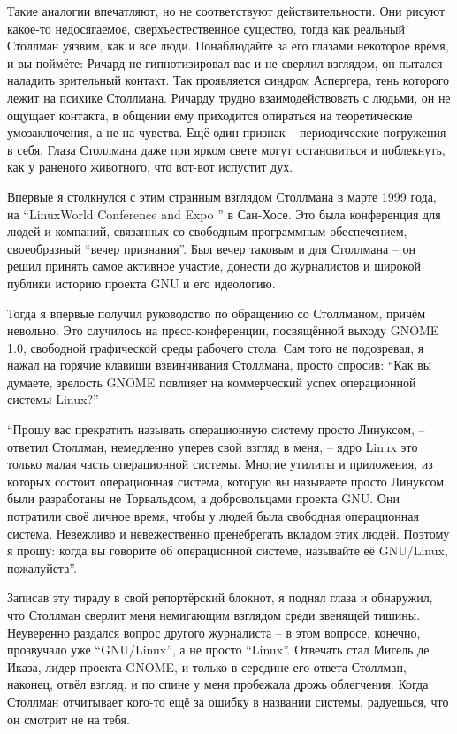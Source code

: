 Такие аналогии впечатляют, но не соответствуют действительности. Они рисуют какое-то недосягаемое, сверхъестественное существо, тогда как реальный Столлман уязвим, как и все люди. Понаблюдайте за его глазами некоторое время, и вы поймёте: Ричард не гипнотизировал вас и не сверлил взглядом, он пытался наладить зрительный контакт. Так проявляется синдром Аспергера, тень которого лежит на психике Столлмана. Ричарду трудно взаимодействовать с людьми, он не ощущает контакта, в общении ему приходится опираться на теоретические умозаключения, а не на чувства. Ещё один признак -- периодические погружения в себя. Глаза Столлмана даже при ярком свете могут остановиться и поблекнуть, как у раненого животного, что вот-вот испустит дух.

Впервые я столкнулся с этим странным взглядом Столлмана в марте 1999 года, на \enquote{LinuxWorld Conference and Expo } в Сан-Хосе. Это была конференция для людей и компаний, связанных со свободным программным обеспечением, своеобразный \enquote{вечер признания}. Был вечер таковым и для Столлмана -- он решил принять самое активное участие, донести до журналистов и широкой публики историю проекта GNU и его идеологию.

Тогда я впервые получил руководство по обращению со Столлманом, причём невольно. Это случилось на пресс-конференции, посвящённой выходу GNOME 1.0, свободной графической среды рабочего стола. Сам того не подозревая, я нажал на горячие клавиши взвинчивания Столлмана, просто спросив: \enquote{Как вы думаете, зрелость GNOME повлияет на коммерческий успех операционной системы Linux?}

\enquote{Прошу вас прекратить называть операционную систему просто Линуксом, -- ответил Столлман, немедленно уперев свой взгляд в меня, -- ядро Linux это только малая часть операционной системы. Многие утилиты и приложения, из которых состоит операционная система, которую вы называете просто Линуксом, были разработаны не Торвальдсом, а добровольцами проекта GNU. Они потратили своё личное время, чтобы у людей была свободная операционная система. Невежливо и невежественно пренебрегать вкладом этих людей. Поэтому я прошу: когда вы говорите об операционной системе, называйте её GNU/Linux, пожалуйста}.

Записав эту тираду в свой репортёрский блокнот, я поднял глаза и обнаружил, что Столлман сверлит меня немигающим взглядом среди звенящей тишины. Неуверенно раздался вопрос другого журналиста -- в этом вопросе, конечно, прозвучало уже \enquote{GNU/Linux}, а не просто \enquote{Linux}. Отвечать стал Мигель де Иказа, лидер проекта GNOME, и только в середине его ответа Столлман, наконец, отвёл взгляд, и по спине у меня пробежала дрожь облегчения. Когда Столлман отчитывает кого-то ещё за ошибку в названии системы, радуешься, что он смотрит не на тебя.

